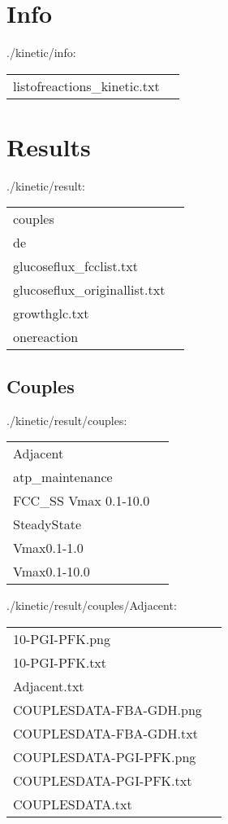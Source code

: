 \documentclass[a4paper, parskip=full]{scrreprt}
\begin{document}
\section{Info}
\label{sec:kininfo}

./kinetic/info:

\begin{longtable}{ll}
listofreactions\_kinetic.txt
\end{longtable}

\section{Results}
\label{sec:kinresult}

./kinetic/result:

\begin{longtable}{ll}
couples\\
de\\
glucoseflux\_fcclist.txt\\
glucoseflux\_originallist.txt\\
growthglc.txt\\
onereaction
\end{longtable}

\subsection{Couples}
\label{ssec:couples}

./kinetic/result/couples:

\begin{longtable}{ll}
Adjacent\\
atp\_maintenance\\
FCC\_SS Vmax 0.1-10.0\\
SteadyState\\
Vmax0.1-1.0\\
Vmax0.1-10.0
\end{longtable}

./kinetic/result/couples/Adjacent:

\begin{longtable}{ll}
10-PGI-PFK.png\\
10-PGI-PFK.txt\\
Adjacent.txt\\
COUPLESDATA-FBA-GDH.png\\
COUPLESDATA-FBA-GDH.txt\\
COUPLESDATA-PGI-PFK.png\\
COUPLESDATA-PGI-PFK.txt\\
COUPLESDATA.txt
\end{longtable}
\end{document}
